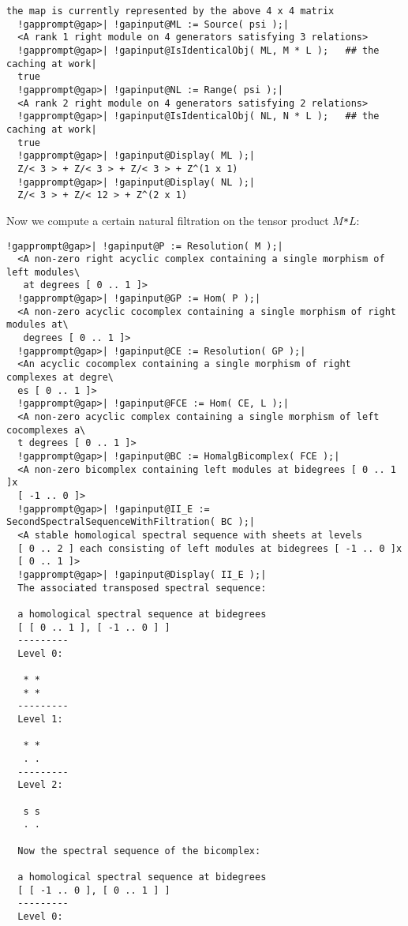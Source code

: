 \documentclass[a4paper,11pt]{report}
\begin{document}
{{{\begin{Verbatim}[commandchars=!@|,fontsize=\small,frame=single,label=Example]
  the map is currently represented by the above 4 x 4 matrix
  !gapprompt@gap>| !gapinput@ML := Source( psi );|
  <A rank 1 right module on 4 generators satisfying 3 relations>
  !gapprompt@gap>| !gapinput@IsIdenticalObj( ML, M * L );	## the caching at work|
  true
  !gapprompt@gap>| !gapinput@NL := Range( psi );|
  <A rank 2 right module on 4 generators satisfying 2 relations>
  !gapprompt@gap>| !gapinput@IsIdenticalObj( NL, N * L );	## the caching at work|
  true
  !gapprompt@gap>| !gapinput@Display( ML );|
  Z/< 3 > + Z/< 3 > + Z/< 3 > + Z^(1 x 1)
  !gapprompt@gap>| !gapinput@Display( NL );|
  Z/< 3 > + Z/< 12 > + Z^(2 x 1)
\end{Verbatim}
 Now we compute a certain natural filtration on the tensor product $M$\texttt{*}$L$: 
\begin{Verbatim}[commandchars=!@|,fontsize=\small,frame=single,label=Example]
  !gapprompt@gap>| !gapinput@P := Resolution( M );|
  <A non-zero right acyclic complex containing a single morphism of left modules\
   at degrees [ 0 .. 1 ]>
  !gapprompt@gap>| !gapinput@GP := Hom( P );|
  <A non-zero acyclic cocomplex containing a single morphism of right modules at\
   degrees [ 0 .. 1 ]>
  !gapprompt@gap>| !gapinput@CE := Resolution( GP );|
  <An acyclic cocomplex containing a single morphism of right complexes at degre\
  es [ 0 .. 1 ]>
  !gapprompt@gap>| !gapinput@FCE := Hom( CE, L );|
  <A non-zero acyclic complex containing a single morphism of left cocomplexes a\
  t degrees [ 0 .. 1 ]>
  !gapprompt@gap>| !gapinput@BC := HomalgBicomplex( FCE );|
  <A non-zero bicomplex containing left modules at bidegrees [ 0 .. 1 ]x
  [ -1 .. 0 ]>
  !gapprompt@gap>| !gapinput@II_E := SecondSpectralSequenceWithFiltration( BC );|
  <A stable homological spectral sequence with sheets at levels 
  [ 0 .. 2 ] each consisting of left modules at bidegrees [ -1 .. 0 ]x
  [ 0 .. 1 ]>
  !gapprompt@gap>| !gapinput@Display( II_E );|
  The associated transposed spectral sequence:
  
  a homological spectral sequence at bidegrees
  [ [ 0 .. 1 ], [ -1 .. 0 ] ]
  ---------
  Level 0:
  
   * *
   * *
  ---------
  Level 1:
  
   * *
   . .
  ---------
  Level 2:
  
   s s
   . .
  
  Now the spectral sequence of the bicomplex:
  
  a homological spectral sequence at bidegrees
  [ [ -1 .. 0 ], [ 0 .. 1 ] ]
  ---------
  Level 0:
  

\end{Verbatim}}}}
\end{document}
